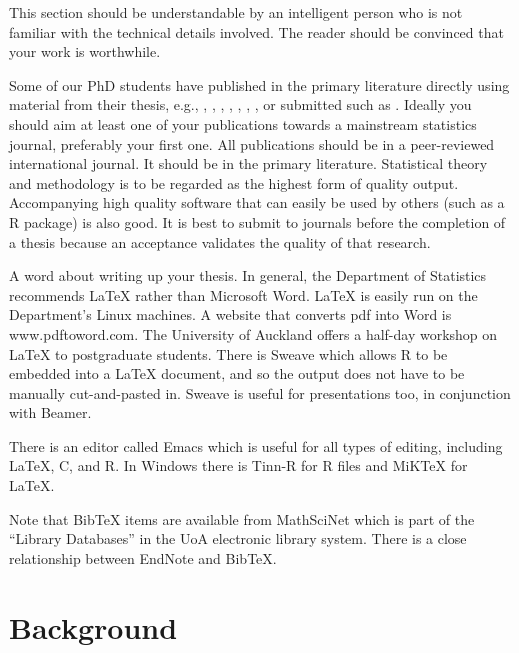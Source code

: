\documentclass[12pt,a4paper]{article}
\begin{document}
This section should be understandable by an intelligent person
who is not familiar with the technical details involved.
The reader should be convinced that your work
is worthwhile.





Some of our PhD students have published in the primary literature
directly using material from their thesis,
e.g.,
\cite{wors:1979},
\cite{yee:wild:1996},
\cite{wild:yee:1996},
\cite{murr:1999},
\cite{jian:scot:wild:2006},
\cite{roev:meye:etal:2007},
\cite{mill:stew:2007},
or submitted such as
\cite{lee:hiro:2008}.
Ideally you should aim at least one of your publications towards
a mainstream statistics journal, preferably your first one.
All publications should be in a peer-reviewed international journal.
It should be in the primary literature.
Statistical theory and methodology is to be regarded as the highest
form of quality output.
Accompanying high quality software that can easily be used
by others (such as a R package) is also good.
It is best to submit to journals before the completion of a thesis
because an acceptance validates the quality of that research.



A word about writing up your thesis.
In general, the Department of Statistics recommends \LaTeX{} rather than
Microsoft Word.
\LaTeX{} is easily run on the Department's Linux machines.
A website that converts pdf into Word is \textsf{www.pdftoword.com}.
The University of Auckland offers a half-day workshop
on \LaTeX{} to postgraduate students.
There is Sweave \citep{lmucs-papers:Leisch:2003b} which allows R
\citep{R:Ihaka+Gentleman:1996} to be embedded into a \LaTeX{}
document, and so the output does not have to be manually
cut-and-pasted in. Sweave is useful for presentations too,
in conjunction with Beamer.


There is an editor called Emacs which is useful for all types of
editing, including \LaTeX{}, C, and R.
In Windows there is Tinn-R for R files and MiKTeX for \LaTeX{}.


Note that {BibTeX} items are available from MathSciNet
which is part of the ``Library Databases'' in the UoA electronic library
system.
There is a close relationship between EndNote and {BibTeX}.






\section{Background}
\label{sec:background}
\end{document}
